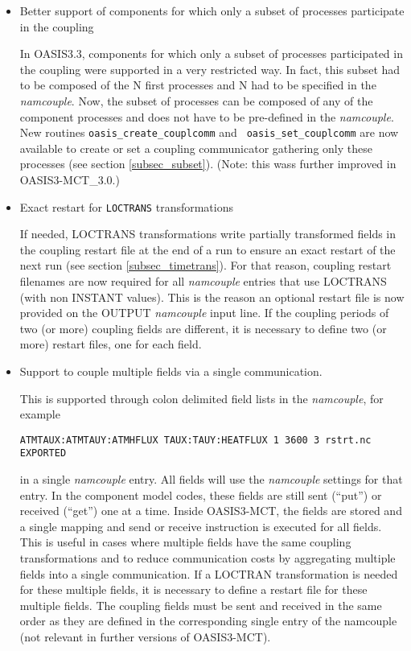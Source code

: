 \begin{itemize}

\item Better support of components for which only a subset of processes
  participate in the coupling

In OASIS3.3, components for which only a subset of processes
  participated in the coupling were supported in a very restricted
  way. In fact, this subset had to be composed of the N first
  processes and N had to be specified in the {\it namcouple}. Now, the
  subset of processes can be composed of any of the component
  processes and does not have to be pre-defined in the {\it
    namcouple}. New routines {\tt oasis\_create\_couplcomm} and {\tt
  oasis\_set\_couplcomm} are now available to create or set a coupling
  communicator gathering only these processes (see section \ref{subsec_subset}). (Note: this wass further improved in OASIS3-MCT\_3.0.)

\item Exact restart for {\tt LOCTRANS} transformations

If needed, LOCTRANS transformations write partially
  transformed fields  in the coupling restart file at the end of a run
  to ensure an exact restart of the next run (see section
  \ref{subsec_timetrans}). For that
  reason, coupling restart filenames are now required for all {\it
    namcouple} entries that use LOCTRANS (with non INSTANT
  values). This is the reason an optional restart file is now provided
  on the OUTPUT {\it namcouple} input line. If the coupling periods of
  two (or more) coupling fields are different, it is necessary to define 
  two (or more) restart files, one for each field.

\item Support to couple multiple fields via a single communication.

 This is supported through colon
delimited field lists in the {\it namcouple}, for example 

{\tt ATMTAUX:ATMTAUY:ATMHFLUX  TAUX:TAUY:HEATFLUX 1 3600 3 rstrt.nc EXPORTED}

 in a single {\it namcouple} entry. All fields will use the
{\it namcouple} settings for that entry. In the component model codes,
these fields are still sent (``put'') or received (``get'') one at a
time. Inside OASIS3-MCT, the fields are stored and a single mapping
and send or receive instruction is executed for all fields. This is
useful in cases where multiple fields have the same coupling
transformations and to reduce communication costs by aggregating multiple 
fields into a single communication. If a LOCTRAN transformation is needed
for these multiple fields, it is necessary to define a restart file for 
these multiple fields. The coupling fields must be sent and received in the same order 
as they are defined in the corresponding single entry of the namcouple
(not relevant in further versions of OASIS3-MCT).


\end{itemize}

